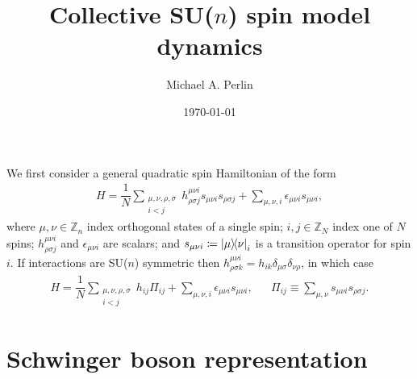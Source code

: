 \documentclass[nofootinbib,notitlepage,11pt]{revtex4-2}
\newcommand{\f}[2]{\dfrac{#1}{#2}} %
\renewcommand{\i}{\mathrm{i}\mkern1mu} %
\newcommand{\1}{\mathds{1}}
\newcommand{\ZZ}{\mathbb{Z}}
\begin{document}
\thispagestyle{fancy}


\title{Collective SU($n$) spin model dynamics}%
\author{Michael A. Perlin}%
\date{\today}

\maketitle

We first consider a general quadratic spin Hamiltonian of the form
\begin{align}
  H = \f1N \sum_{\substack{\mu,\nu,\rho,\sigma\\i<j}}
  h^{\mu\nu i}_{\rho\sigma j} s_{\mu\nu i} s_{\rho\sigma j}
  + \sum_{\mu,\nu,i} \epsilon_{\mu\nu i} s_{\mu\nu i},
  \label{eq:spin}
\end{align}
where $\mu,\nu\in\ZZ_n$ index orthogonal states of a single spin;
$i,j\in\ZZ_N$ index one of $N$ spins; $h^{\mu\nu i}_{\rho\sigma j}$
and $\epsilon_{\mu\nu i}$ are scalars; and
$s_{\mu\nu i}\coloneqq\op{\mu}{\nu}_i$ is a transition operator for
spin $i$.  If interactions are SU($n$) symmetric then
$h^{\mu\nu i}_{\rho\sigma k} = h_{ik}
\delta_{\mu\sigma}\delta_{\nu\rho}$, in which case
\begin{align}
  H = \f1N \sum_{\substack{\mu,\nu,\rho,\sigma\\i<j}}
  h_{ij} \Pi_{ij}
  + \sum_{\mu,\nu,i} \epsilon_{\mu\nu i} s_{\mu\nu i},
  &&
  \Pi_{ij} \equiv \sum_{\mu,\nu} s_{\mu\nu i} s_{\rho\sigma j}.
  \label{eq:spin_sun}
\end{align}

\section{Schwinger boson representation}
\end{document}
